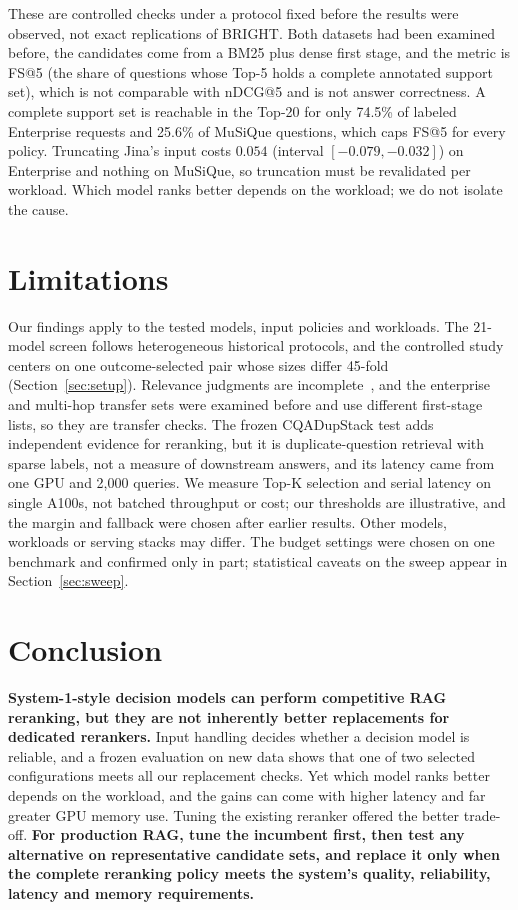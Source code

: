 \documentclass[conference]{IEEEtran}
\begin{document}
{These are controlled checks under a protocol fixed before the results were observed, not exact replications of BRIGHT. Both datasets had been examined before, the candidates come from a BM25 plus dense first stage, and the metric is FS@5 (the share of questions whose Top-5 holds a complete annotated support set), which is not comparable with nDCG@5 and is not answer correctness. A complete support set is reachable in the Top-20 for only 74.5\% of labeled Enterprise requests and 25.6\% of MuSiQue questions, which caps FS@5 for every policy. Truncating Jina's input costs $0.054$ (interval $[-0.079,-0.032]$) on Enterprise and nothing on MuSiQue, so truncation must be revalidated per workload. Which model ranks better depends on the workload; we do not isolate the cause.

\section{Limitations}\label{sec:lessons}
Our findings apply to the tested models, input policies and workloads. The 21-model screen follows heterogeneous historical protocols, and the controlled study centers on one outcome-selected pair whose sizes differ 45-fold (Section~\ref{sec:setup}). Relevance judgments are incomplete~\cite{buckley2004incomplete}, and the enterprise and multi-hop transfer sets were examined before and use different first-stage lists, so they are transfer checks. The frozen CQADupStack test adds independent evidence for reranking, but it is duplicate-question retrieval with sparse labels, not a measure of downstream answers, and its latency came from one GPU and 2,000 queries. We measure Top-K selection and serial latency on single A100s, not batched throughput or cost; our thresholds are illustrative, and the margin and fallback were chosen after earlier results. Other models, workloads or serving stacks may differ. The budget settings were chosen on one benchmark and confirmed only in part; statistical caveats on the sweep appear in Section~\ref{sec:sweep}.

\section{Conclusion}
\textbf{System-1-style decision models can perform competitive RAG reranking, but they are not inherently better replacements for dedicated rerankers.} Input handling decides whether a decision model is reliable, and a frozen evaluation on new data shows that one of two selected configurations meets all our replacement checks. Yet which model ranks better depends on the workload, and the gains can come with higher latency and far greater GPU memory use. Tuning the existing reranker offered the better trade-off. \textbf{For production RAG, tune the incumbent first, then test any alternative on representative candidate sets, and replace it only when the complete reranking policy meets the system's quality, reliability, latency and memory requirements.}

}
\end{document}
